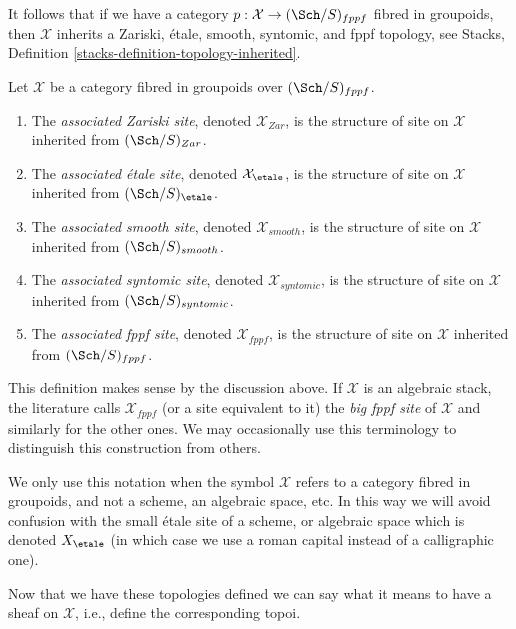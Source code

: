 \medskip\noindent
It follows that if we have a category
$p : \mathcal{X} \to (\Sch/S)_{fppf}$ fibred in groupoids, then
$\mathcal{X}$ inherits a Zariski, \'etale, smooth, syntomic, and
fppf topology, see
Stacks, Definition \ref{stacks-definition-topology-inherited}.

\begin{definition}
\label{definition-inherited-topologies}
Let $\mathcal{X}$ be a category fibred in groupoids over
$(\Sch/S)_{fppf}$.
\begin{enumerate}
\item The {\it associated Zariski site}, denoted $\mathcal{X}_{Zar}$,
is the structure of site on $\mathcal{X}$ inherited from
$(\Sch/S)_{Zar}$.
\item The {\it associated \'etale site}, denoted $\mathcal{X}_\etale$,
is the structure of site on $\mathcal{X}$ inherited from
$(\Sch/S)_\etale$.
\item The {\it associated smooth site}, denoted $\mathcal{X}_{smooth}$,
is the structure of site on $\mathcal{X}$ inherited from
$(\Sch/S)_{smooth}$.
\item The {\it associated syntomic site}, denoted $\mathcal{X}_{syntomic}$,
is the structure of site on $\mathcal{X}$ inherited from
$(\Sch/S)_{syntomic}$.
\item The {\it associated fppf site}, denoted $\mathcal{X}_{fppf}$,
is the structure of site on $\mathcal{X}$ inherited from
$(\Sch/S)_{fppf}$.
\end{enumerate}
\end{definition}

\noindent
This definition makes sense by the discussion above. If $\mathcal{X}$
is an algebraic stack, the literature calls $\mathcal{X}_{fppf}$ (or a
site equivalent to it) the {\it big fppf site} of $\mathcal{X}$ and similarly
for the other ones. We may occasionally use this terminology to
distinguish this construction from others.

\begin{remark}
\label{remark-ambiguity}
We only use this notation when the symbol $\mathcal{X}$ refers to a
category fibred in groupoids, and not a scheme, an algebraic space, etc.
In this way we will avoid confusion with the small \'etale site of a
scheme, or algebraic space which is denoted $X_\etale$ (in which
case we use a roman capital instead of a calligraphic one).
\end{remark}

\noindent
Now that we have these topologies defined we can say what it means
to have a sheaf on $\mathcal{X}$, i.e., define the corresponding topoi.

